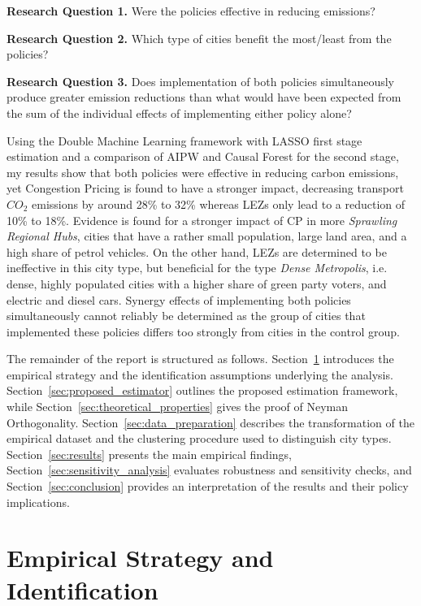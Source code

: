 \documentclass[12pt, a4paper]{article}
\begin{document}
 \textbf{Research Question 1. } Were the policies effective in reducing emissions?

\textbf{Research Question 2. } Which type of cities benefit the most/least from the policies?

\textbf{Research Question 3. } Does implementation of both policies simultaneously produce greater emission reductions than what would have been expected from the sum of the individual effects of implementing either policy alone?

Using the Double Machine Learning framework with LASSO first stage estimation and a comparison of AIPW and Causal Forest for the second stage, my results show that both policies were effective in reducing carbon emissions, yet Congestion Pricing is found to have a stronger impact, decreasing transport $CO_2$ emissions by around 28\% to 32\% whereas LEZs only lead to a reduction of 10\% to 18\%. Evidence is found for a stronger impact of CP in more \textit{Sprawling Regional Hubs}, cities that have a rather small population, large land area, and a high share of petrol vehicles. On the other hand, LEZs are determined to be ineffective in this city type, but beneficial for the type \textit{Dense Metropolis}, i.e. dense, highly populated cities with a higher share of green party voters, and electric and diesel cars. Synergy effects of implementing both policies simultaneously cannot reliably be determined as the group of cities that implemented these policies differs too strongly from cities in the control group.

The remainder of the report is structured as follows. Section~\ref{sec:emp_strategy} introduces the empirical strategy and the identification assumptions underlying the analysis. Section~\ref{sec:proposed_estimator} outlines the proposed estimation framework, while Section~\ref{sec:theoretical_properties} gives the proof of Neyman Orthogonality. Section~\ref{sec:data_preparation} describes the transformation of the empirical dataset and the clustering procedure used to distinguish city types. Section~\ref{sec:results} presents the main empirical findings, Section~\ref{sec:sensitivity_analysis} evaluates robustness and sensitivity checks, and Section~\ref{sec:conclusion} provides an interpretation of the results and their policy implications.

\section{Empirical Strategy and Identification}
\label{sec:emp_strategy}
\end{document}
